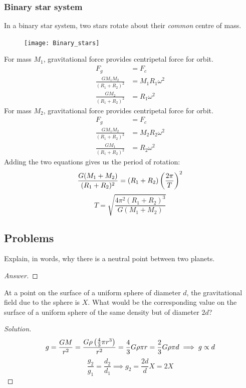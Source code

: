 \subsubsection{Binary star system}
In a binary star system, two stars rotate about their \emph{common} centre of mass.
\begin{figure}[H]
	\centering
	\texttt{[image: Binary\_stars]}
\end{figure}
For mass $M_1$, gravitational force provides centripetal force for orbit.
\begin{align*}
F_g &= F_c \\
\frac{GM_1M_2}{(R_1+R_2)^2} &= M_1R_1\omega^2 \\
\frac{GM_2}{(R_1+R_2)^2} &= R_1\omega^2
\end{align*}
For mass $M_2$, gravitational force provides centripetal force for orbit.
\begin{align*}
F_g &= F_c \\
\frac{GM_1M_2}{(R_1+R_2)^2} &= M_2R_2\omega^2 \\
\frac{GM_1}{(R_1+R_2)^2} &= R_2\omega^2
\end{align*}
Adding the two equations gives us the period of rotation:
\[ \frac{G(M_1+M_2)}{(R_1+R_2)^2} = (R_1+R_2)\left(\frac{2\pi}{T}\right)^2 \]
\[ \boxed{T = \sqrt{\frac{4\pi^2(R_1+R_2)^3}{G(M_1+M_2)}}} \]
\pagebreak

\subsection{Problems}
\begin{prbm}
Explain, in words, why there is a neutral point between two planets.
\end{prbm}
\begin{proof}[Answer]

\end{proof}

\begin{prbm}
At a point on the surface of a uniform sphere of diameter $d$, the gravitational field due to the sphere is $X$. What would be the corresponding value on the surface of a uniform sphere of the same density but of diameter $2d$?
\end{prbm}

\begin{proof}[Solution]
\[ g=\frac{GM}{r^2}=\frac{G\rho\left(\frac{4}{3}\pi r^3\right)}{r^2}=\frac{4}{3}G\rho\pi r=\frac{2}{3}G\rho\pi d \implies g \propto d \]
\[ \frac{g_2}{g_1}=\frac{d_2}{d_1} \implies g_2=\frac{2d}{d}X=2X \]
\end{proof}

